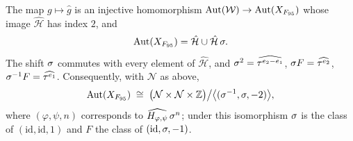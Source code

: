\begin{theorem}\label{cl:thm:95Aut}
The map $g\mapsto\hat g$ is an injective homomorphism $\operatorname{Aut}(\mathcal W)\to\operatorname{Aut}(X_{F_{95}})$ whose image $\hat{\mathcal H}$ has index $2$, and
\[
\operatorname{Aut}(X_{F_{95}})=\hat{\mathcal H}\cup\hat{\mathcal H}\,\sigma .
\]
The shift $\sigma$ commutes with every element of $\hat{\mathcal H}$, and $\sigma^2=\widehat{\tau^{e_2-e_1}}$, $\sigma F=\widehat{\tau^{e_2}}$, $\sigma^{-1}F=\widehat{\tau^{e_1}}$. Consequently, with $\mathcal N$ as above,
\[
\operatorname{Aut}(X_{F_{95}})\;\cong\;\bigl(\mathcal N\times\mathcal N\times\mathbb{Z}\bigr)\big/\bigl\langle(\sigma^{-1},\sigma,-2)\bigr\rangle ,
\]
where $(\varphi,\psi,n)$ corresponds to $\widehat{H_{\varphi,\psi}}\,\sigma^n$; under this isomorphism $\sigma$ is the class of $(\mathrm{id},\mathrm{id},1)$ and $F$ the class of $(\mathrm{id},\sigma,-1)$.
\end{theorem}

